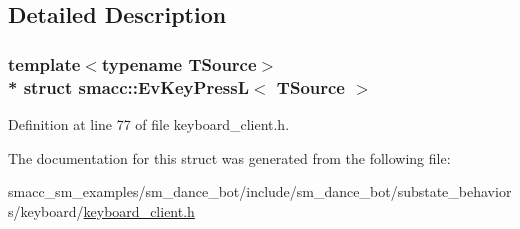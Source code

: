 \subsection{Detailed Description}
\subsubsection*{template$<$typename T\+Source$>$\\*
struct smacc\+::\+Ev\+Key\+Press\+L$<$ T\+Source $>$}



Definition at line 77 of file keyboard\+\_\+client.\+h.



The documentation for this struct was generated from the following file\+:\begin{DoxyCompactItemize}
\item 
smacc\+\_\+sm\+\_\+examples/sm\+\_\+dance\+\_\+bot/include/sm\+\_\+dance\+\_\+bot/substate\+\_\+behaviors/keyboard/\hyperlink{keyboard__client_8h}{keyboard\+\_\+client.\+h}\end{DoxyCompactItemize}
